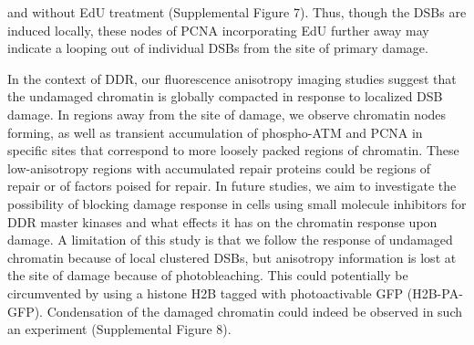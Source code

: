 and without EdU treatment (Supplemental Figure 7). Thus, though the DSBs are induced locally, these nodes of PCNA incorporating EdU further away may indicate a looping out of individual DSBs from the site of primary damage.


 In the context of DDR, our fluorescence anisotropy imaging studies suggest that the undamaged chromatin is globally compacted in response to localized DSB damage. In regions away from the site of damage, we observe chromatin nodes forming, as well as transient accumulation of phospho-ATM and PCNA in specific sites that correspond to more loosely packed regions of chromatin. These low-anisotropy regions with accumulated repair proteins could be regions of repair or of factors poised for repair. In future studies, we aim to investigate the possibility of blocking damage response in cells using small molecule inhibitors for DDR master kinases and what effects it has on the chromatin response upon damage. A limitation of this study is that we follow the response of undamaged chromatin because of local clustered DSBs, but anisotropy information is lost at the site of damage because of photobleaching. This could potentially be circumvented by using a histone H2B tagged with photoactivable GFP (H2B-PA-GFP). Condensation of the damaged chromatin could indeed be observed in such an experiment (Supplemental Figure 8).
